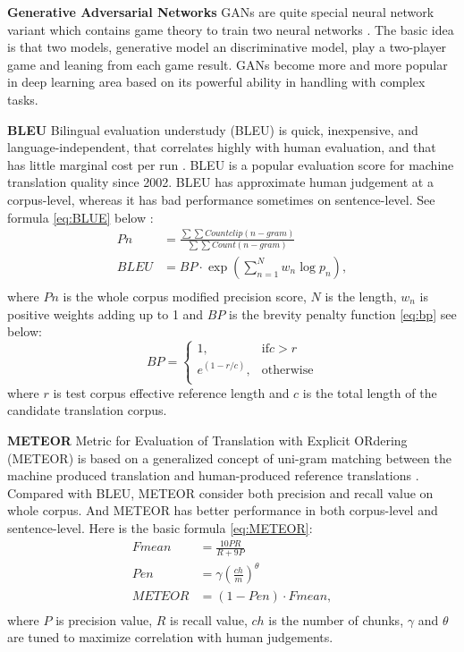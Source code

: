 \documentclass[11pt]{article}
\begin{document}
{\bf Generative Adversarial Networks } GANs are quite special neural network variant which contains game theory to train two neural networks \cite{goodfellow2014generative}. The basic idea is that two models, generative model an discriminative model, play a two-player game and leaning from each game result. GANs become more and more popular in deep learning area based on its powerful ability in handling with complex tasks.

{\bf BLEU} Bilingual evaluation understudy (BLEU) is quick,
inexpensive, and language-independent,
that correlates highly with human evaluation,
and that has little marginal cost per
run \cite{papineni2002bleu}. BLEU is a popular evaluation score for machine translation quality since 2002. BLEU has approximate human judgement at a corpus-level, whereas it has bad performance sometimes on sentence-level. See formula \ref{eq:BLUE} below :
\begin{equation}
\begin{aligned}
Pn &= \frac{\sum\sum Countclip(n-gram)}{\sum \sum Count(n-gram)} \\
BLEU &= BP \cdot \exp \left(\sum_{n=1}^{N} w_n \log p_n\right), \\
\end{aligned}
\label{eq:BLUE}
\end{equation}
where $Pn$ is the whole corpus modified precision score, $N$ is the length, $w_n$ is positive weights adding up to 1 and $BP$ is the brevity penalty function \ref{eq:bp} see below:
\begin{equation}
BP=\begin{cases}
               1, & \text{if} c > r\\
               e^{(1-r/c)}, & \text{otherwise}\\
            \end{cases}
\label{eq:bp}
\end{equation}
where $r$ is test corpus effective reference length and $c$ is the total length of the candidate translation corpus. 

{\bf METEOR} Metric for Evaluation of Translation with Explicit ORdering (METEOR)  is based on a generalized concept of
uni-gram matching between the machine produced
translation and human-produced
reference translations \cite{banerjee2005meteor}. Compared with BLEU, METEOR consider both precision and recall value on whole corpus. And METEOR has better performance in both corpus-level and sentence-level. Here is the basic formula \ref{eq:METEOR}:
\begin{equation}
\begin{aligned}
Fmean &= \frac{10PR}{R+9P} \\
Pen &= \gamma \left(\frac{ch}{m}\right)^{\theta} \\
METEOR &= (1-Pen) \cdot Fmean, \\
\end{aligned}
\label{eq:METEOR}
\end{equation}
where $P$ is precision value, $R$ is recall value, $ch$ is the number of chunks, $\gamma$ and $\theta$ are tuned
to maximize correlation with human judgements.
\end{document}
